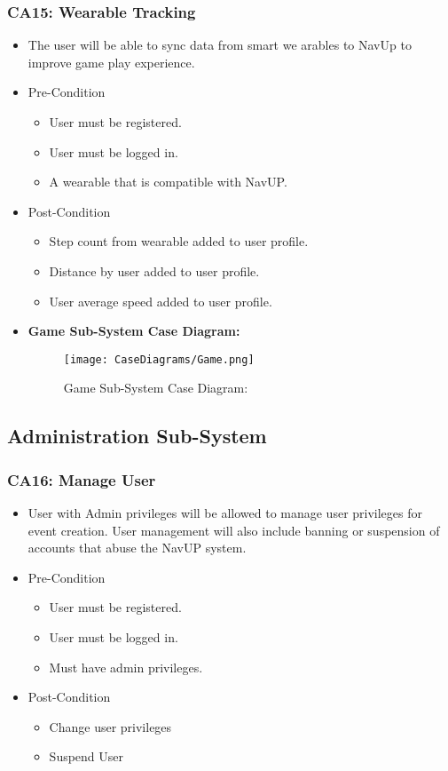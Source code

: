 \documentclass[12pt,a4paper]{article}
\begin{document}
		\subsubsection{CA15: Wearable Tracking}
			\begin{itemize}
				\item The user will be able to sync data from smart we arables to NavUp to improve game play experience.
				\item Pre-Condition
					\begin{itemize}
						\item User must be registered.
						\item User must be logged in.
						\item A wearable that is compatible with NavUP.
					\end{itemize}
				\item Post-Condition
					\begin{itemize}
						\item Step count from wearable added to user profile.
						\item Distance  by user added to user profile.
						\item User average speed added to user profile.
					\end{itemize}
				\item \textbf{Game Sub-System Case Diagram:}
				\begin{figure}[H]
					\texttt{[image: CaseDiagrams/Game.png]}
					\caption{Game Sub-System Case Diagram:}
				\end{figure}
			\end{itemize}
	\subsection{Administration Sub-System}
		\subsubsection{CA16: Manage User}
			\begin{itemize}
				\item User with Admin privileges will be allowed to manage user privileges for event creation. User management will also include banning or suspension of accounts that abuse the NavUP system.
				\item Pre-Condition
					\begin{itemize}
						\item User must be registered.
						\item User must be logged in.
						\item Must have admin privileges.
					\end{itemize}
				\item Post-Condition
					\begin{itemize}
						\item Change user privileges
						\item Suspend User
					\end{itemize}
			\end{itemize}
\end{document}
